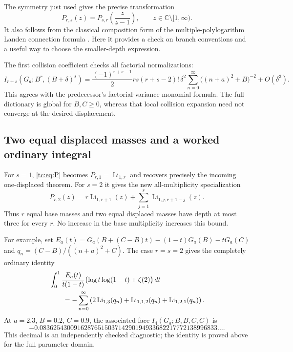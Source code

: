 The symmetry just used gives the precise transformation
\begin{equation}\label{tc:eq:Landen}
 P_{r,s}(z)=P_{s,r}\!\left(\frac{z}{z-1}\right),
       \qquad z\in\mathbb C\setminus[1,\infty).
\end{equation}
It also follows from the classical composition form of the
multiple-polylogarithm Landen connection formula
\cite{okudaueno}.  Here it provides a check on branch conventions
and a useful way to choose the smaller-depth expression.

The first collision coefficient checks all factorial normalizations:
\begin{equation}\label{tc:eq:collision-check}
 I_{r+s}(G_a;B^r,(B+\delta)^s)
  =\frac{(-1)^{r+s-1}}2rs(r+s-2)!\,
     \delta^2\sum_{n=0}^{\infty}
                     \bigl((n+a)^2+B\bigr)^{-2}
       +O(\delta^3).
\end{equation}
This agrees with the predecessor's factorial-variance monomial
formula.  The full dictionary is global for $B,C\ge0$, whereas
that local collision expansion need not converge at the desired
displacement.

\subsection{Two equal displaced masses and a worked ordinary integral}

For $s=1$, \eqref{tc:eq:P} becomes
$P_{r,1}=\operatorname{Li}_{1,r}$ and recovers precisely the
incoming one-displaced theorem.  For $s=2$ it gives the new
all-multiplicity specialization
\begin{equation}\label{tc:eq:two-displaced}
 \boxed{\displaystyle
 P_{r,2}(z)=r\operatorname{Li}_{1,r+1}(z)
     +\sum_{j=1}^{r}\operatorname{Li}_{1,j,r+1-j}(z).}
\end{equation}
Thus $r$ equal base masses and two equal displaced masses have
depth at most three for every $r$.  No increase in the base
multiplicity increases this bound.

For example, set
$E_a(t)=G_a(B+(C-B)t)-(1-t)G_a(B)-tG_a(C)$ and
$q_n=(C-B)/((n+a)^2+C)$.  The case $r=s=2$ gives the completely
ordinary identity
\begin{align}
 &\int_0^1\frac{E_a(t)}{t(1-t)}
                 \bigl(\log t\log(1-t)+\zeta(2)\bigr)\,dt
       \notag\\
 &\qquad=-\sum_{n=0}^{\infty}
   \left(2\operatorname{Li}_{1,3}(q_n)
         +\operatorname{Li}_{1,1,2}(q_n)
         +\operatorname{Li}_{1,2,1}(q_n)\right).
                                                     \label{tc:eq:worked-integral}
\end{align}
At $a=2.3$, $B=0.2$, $C=0.9$, the associated face
$I_4(G_a;B,B,C,C)$ is
\[
 -0.0836254300916287651503714290194933682217772138996833\ldots.
\]
This decimal is an independently checked diagnostic; the identity
is proved above for the full parameter domain.


